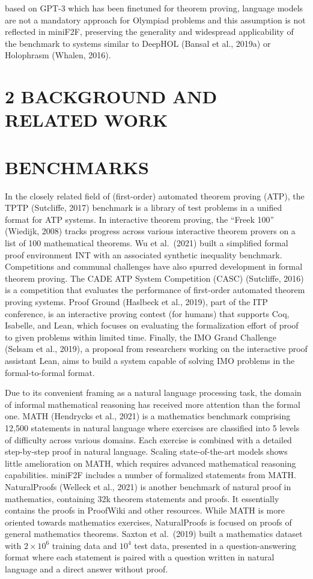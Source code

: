 \documentclass[
]{article}
\begin{document}
based on GPT-3 which has been finetuned for theorem proving, language
models are not a mandatory approach for Olympiad problems and this
assumption is not reflected in miniF2F, preserving the generality and
widespread applicability of the benchmark to systems similar to DeepHOL
(Bansal et al., 2019a) or Holophrasm (Whalen, 2016).

\section{2 BACKGROUND AND RELATED
WORK}\label{background-and-related-work}

\section{BENCHMARKS}\label{benchmarks}

In the closely related field of (first-order) automated theorem proving
(ATP), the TPTP (Sutcliffe, 2017) benchmark is a library of test
problems in a unified format for ATP systems. In interactive theorem
proving, the ``Freek 100'' (Wiedijk, 2008) tracks progress across
various interactive theorem provers on a list of 100 mathematical
theorems. Wu et al.~(2021) built a simplified formal proof environment
INT with an associated synthetic inequality benchmark. Competitions and
communal challenges have also spurred development in formal theorem
proving. The CADE ATP System Competition (CASC) (Sutcliffe, 2016) is a
competition that evaluates the performance of first-order automated
theorem proving systems. Proof Ground (Haslbeck et al., 2019), part of
the ITP conference, is an interactive proving contest (for humans) that
supports Coq, Isabelle, and Lean, which focuses on evaluating the
formalization effort of proof to given problems within limited time.
Finally, the IMO Grand Challenge (Selsam et al., 2019), a proposal from
researchers working on the interactive proof assistant Lean, aims to
build a system capable of solving IMO problems in the formal-to-formal
format.

Due to its convenient framing as a natural language processing task, the
domain of informal mathematical reasoning has received more attention
than the formal one. MATH (Hendrycks et al., 2021) is a mathematics
benchmark comprising 12,500 statements in natural language where
exercises are classified into 5 levels of difficulty across various
domains. Each exercise is combined with a detailed step-by-step proof in
natural language. Scaling state-of-the-art models shows little
amelioration on MATH, which requires advanced mathematical reasoning
capabilities. miniF2F includes a number of formalized statements from
MATH. NaturalProofs (Welleck et al., 2021) is another benchmark of
natural proof in mathematics, containing 32k theorem statements and
proofs. It essentially contains the proofs in ProofWiki and other
resources. While MATH is more oriented towards mathematics exercises,
NaturalProofs is focused on proofs of general mathematics theorems.
Saxton et al.~(2019) built a mathematics dataset with
\(2 \times 10^{6}\) training data and \(10^{4}\) test data, presented in
a question-answering format where each statement is paired with a
question written in natural language and a direct answer without proof.
\end{document}
